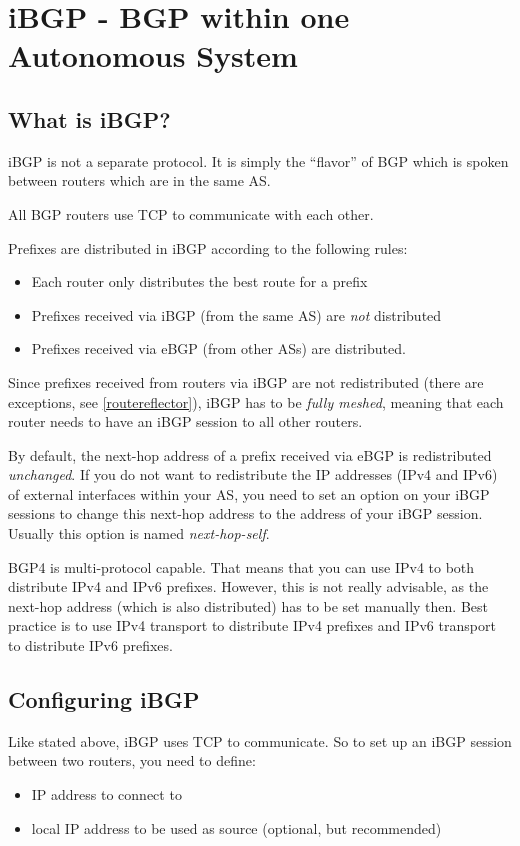 \chapter{iBGP - BGP within one Autonomous System}
\section{What is iBGP?}
iBGP is not a separate protocol. It is simply the ``flavor'' of BGP which is spoken between routers which are in the same \gls{AS}.

All BGP routers use \gls{TCP} to communicate with each other.

Prefixes are distributed in iBGP according to the following rules:
\begin{itemize}
  \item Each router only distributes the best route for a prefix
  \item Prefixes received via iBGP (from the same \gls{AS}) are \emph{not} distributed
  \item Prefixes received via eBGP (from other \glspl{AS}) are distributed.
\end{itemize}
Since prefixes received from routers via iBGP are not redistributed (there are exceptions, see \ref{routereflector}), iBGP has to be \emph{fully meshed}, meaning that each router needs to have an iBGP session to all other routers.

By default, the next-hop address of a prefix received via eBGP is redistributed \emph{unchanged}. If you do not want to redistribute the IP addresses (IPv4 and IPv6) of external interfaces within your \gls{AS}, you need to set an option on your iBGP sessions to change this next-hop address to the address of your iBGP session. Usually this option is named \emph{next-hop-self}.

BGP4 is multi-protocol capable. That means that you can use IPv4 to both distribute IPv4 and IPv6 prefixes. However, this is not really advisable, as the next-hop address (which is also distributed) has to be set manually then. Best practice is to use IPv4 transport to distribute IPv4 prefixes and IPv6 transport to distribute IPv6 prefixes.

\section{Configuring iBGP}
Like stated above, iBGP uses \gls{TCP} to communicate. So to set up an iBGP session between two routers, you need to define:
\begin{itemize}
  \item IP address to connect to
  \item local IP address to be used as source (optional, but recommended)
\end{itemize}

